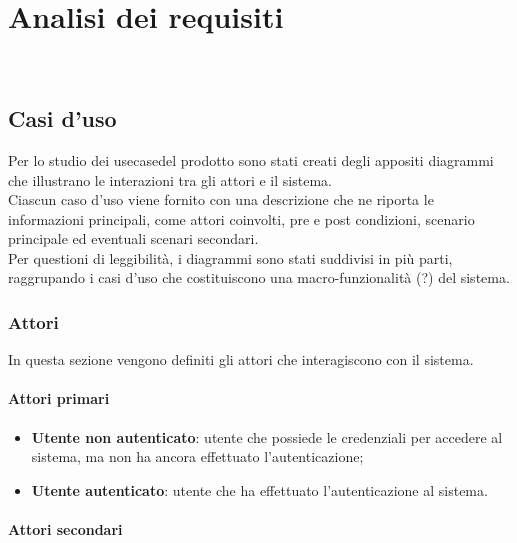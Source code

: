 \chapter{Analisi dei requisiti}
\label{cap:analisi-requisiti}

\\

\section{Casi d'uso}
\label{sec:usecase}

Per lo studio dei \gls{usecase}\glsoccur del prodotto sono stati creati degli appositi diagrammi che illustrano le interazioni tra gli attori e il sistema.\\
Ciascun caso d'uso viene fornito con una descrizione che ne riporta le informazioni principali, come attori coinvolti, pre e post condizioni, scenario principale ed eventuali scenari secondari.\\
Per questioni di leggibilità, i diagrammi sono stati suddivisi in più parti, raggrupando i casi d'uso che costituiscono una macro-funzionalità (?) del sistema.

\subsection{Attori}
\label{subsec:attori}

In questa sezione vengono definiti gli attori che interagiscono con il sistema.

\subsubsection{Attori primari}
\label{subsubsec:attori-primari}

\begin{itemize}
    \item \textbf{Utente non autenticato}: utente che possiede le credenziali per accedere al sistema, ma non ha ancora effettuato l'autenticazione;
    \item \textbf{Utente autenticato}: utente che ha effettuato l'autenticazione al sistema.
\end{itemize}

\subsubsection{Attori secondari}
\label{subsubsec:attori-secondari}


